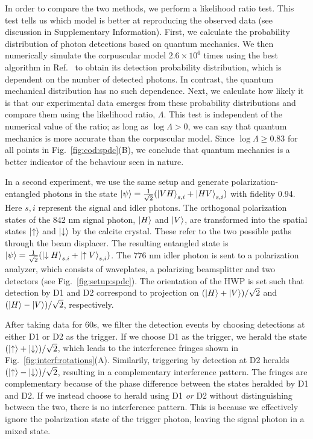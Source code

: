 \documentclass[prl,reprint,twocolumn,amsmath,preprintnumbers,amssymb,superscriptaddress]{revtex4-1}
\newcommand{\figref}[1]{Fig.~\ref{#1}}
\begin{document}
In order to compare the two methods, we perform a likelihood ratio test. This test tells us which model is better at reproducing the observed data (see discussion in Supplementary Information). First, we calculate the probability distribution of photon detections based on quantum mechanics. We then numerically simulate the corpuscular model $2.6 \times 10^6$ times using the best algorithm in Ref.~\cite{Jin2010a} to obtain its detection probability distribution, which is dependent on the number of detected photons. In contrast, the quantum mechanical distribution has no such dependence.  Next, we calculate how likely it is that our experimental data emerges from these probability distributions and compare them using the likelihood ratio, $\Lambda$. This test is independent of the numerical value of the ratio; as long as $\log \Lambda>0$, we can say that quantum mechanics is more accurate than the corpuscular model. Since $\log \Lambda \geq 0.83$ for all points in \figref{fig:cod:spdc}(B), we conclude that quantum mechanics is a better indicator of the behaviour seen in nature.





In a second experiment, we use the same setup and generate polarization-entangled photons in the state $\ket{\psi} = \frac{1}{\sqrt{2}}(\ket{VH}_{s,i}+\ket{HV}_{s,i})$ with fidelity 0.94. Here $s,i$ represent the signal and idler photons. The orthogonal polarization states of the $842$ nm signal photon, $\ket{H}$ and $\ket{V}$, are transformed into the spatial states $\ket{\uparrow}$ and $\ket{\downarrow}$ by the calcite crystal. These refer to the two possible paths through the beam displacer. The resulting entangled state is $\ket{\psi} = \frac{1}{\sqrt{2}}(\ket{\downarrow H}_{s,i}+\ket{\uparrow V}_{s,i})$. The $776$ nm idler photon is sent to a polarization analyzer, which consists of waveplates, a polarizing beamsplitter and two detectors (see \figref{fig:setup:spdc}). The orientation of the HWP is set such that detection by D1 and D2 correspond to projection on $(\ket{H}+\ket{V})/\sqrt{2}$ and $(\ket{H}-\ket{V})/\sqrt{2}$, respectively. 

After taking data for 60s, we filter the detection events by choosing detections at either D1 or D2 as the trigger. If we choose D1 as the trigger, we herald the state $(\ket{\uparrow}+\ket{\downarrow})/\sqrt{2}$, which leads to the interference fringes shown in \figref{fig:interf:rotations}(A). Similarily, triggering by detection at D2 heralds $(\ket{\uparrow}-\ket{\downarrow})/\sqrt{2}$, resulting in a complementary interference pattern. The fringes are complementary because of the phase difference between the states heralded by D1 and D2. If we instead choose to herald using D1 \emph{or} D2 without distinguishing between the two, there is no interference pattern. This is because we effectively ignore the polarization state of the trigger photon, leaving the signal photon in a mixed state.
 
\end{document}
